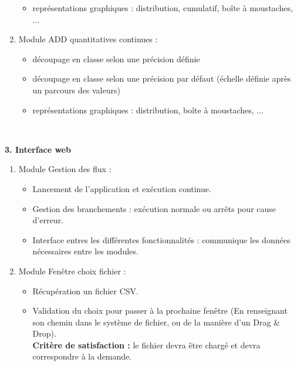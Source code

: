 \begin{description}[style=unboxed,leftmargin=0.2cm]
\begin{enumerate}
\begin{itemize}
						\item représentations graphiques : distribution, cumulatif,  boîte à moustaches, ...
						\end{itemize}
					\item Module ADD quantitatives continues :
						\begin{itemize}
						\item découpage en classe selon une précision définie
						\item découpage en classe selon une précision par défaut (échelle définie après un parcours des valeurs)
						\item représentations graphiques : distribution, boîte à moustaches, ...
						\end{itemize}
				\end{enumerate}
				~\\
				\item\textbf{3. Interface web}
				\begin{enumerate}
					\item Module Gestion des flux :
						\begin{itemize}
						\item Lancement de l'application et exécution continue.
						\item Gestion des branchements : exécution normale ou arrêts pour cause d'erreur.
						\item Interface entres les différentes fonctionnalités : communique les données nécessaires entre les modules.
						\end{itemize}
						
					\item Module Fenêtre choix fichier :
						\begin{itemize}
						\item Récupération un fichier CSV.
						\item Validation du choix pour passer à la prochaine fenêtre (En renseignant son chemin dans le système de fichier, ou de la manière d'un Drag \& Drop).\\
						\textbf{Critère de satisfaction : } le fichier devra être chargé  et devra correspondre à la demande.
						\end{itemize}
						

\end{enumerate}
\end{description}
